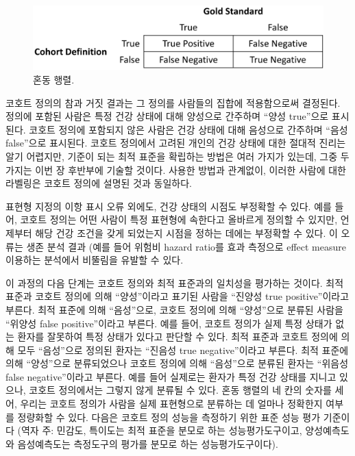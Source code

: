 \documentclass[10.5pt]{book}
\theoremstyle{definition}
\theoremstyle{definition}
\theoremstyle{definition}
\theoremstyle{remark}
\begin{document}
\begin{figure}

{\centering \includegraphics[width=0.75\linewidth]{images/ClinicalValidity/matrix} 

}

\caption{혼동 행렬.}\label{fig:matrix}
\end{figure}

코호트 정의의 참과 거짓 결과는 그 정의를 사람들의 집합에 적용함으로써
결정된다. 정의에 포함된 사람은 특정 건강 상태에 대해 양성으로 간주하며
``양성 true''으로 표시된다. 코호트 정의에 포함되지 않은 사람은 건강
상태에 대해 음성으로 간주하며 ``음성 false''으로 표시된다. 코호트
정의에서 고려된 개인의 건강 상태에 대한 절대적 진리는 알기 어렵지만,
기준이 되는 최적 표준을 확립하는 방법은 여러 가지가 있는데, 그중 두
가지는 이번 장 후반부에 기술할 것이다. 사용한 방법과 관계없이, 이러한
사람에 대한 라벨링은 코호트 정의에 설명된 것과 동일하다.

표현형 지정의 이항 표시 오류 외에도, 건강 상태의 시점도 부정확할 수
있다. 예를 들어, 코호트 정의는 어떤 사람이 특정 표현형에 속한다고
올바르게 정의할 수 있지만, 언제부터 해당 건강 조건을 갖게 되었는지
시점을 정하는 데에는 부정확할 수 있다. 이 오류는 생존 분석 결과 (예를
들어 위험비 hazard ratio를 효과 측정으로 effect measure 이용하는
분석에서 비뚤림을 유발할 수 있다.

이 과정의 다음 단계는 코호트 정의와 최적 표준과의 일치성을 평가하는
것이다. 최적 표준과 코호트 정의에 의해 ``양성''이라고 표기된 사람을
``진양성 true positive''이라고 부른다. 최적 표준에 의해 ``음성''으로,
코호트 정의에 의해 ``양성''으로 분류된 사람을 ``위양성 false
positive''이라고 부른다. 예를 들어, 코호트 정의가 실제 특정 상태가 없는
환자를 잘못하여 특정 상태가 있다고 판단할 수 있다. 최적 표준과 코호트
정의에 의해 모두 ``음성''으로 정의된 환자는 ``진음성 true
negative''이라고 부른다. 최적 표준에 의해 ``양성''으로 분류되었으나
코호트 정의에 의해 ``음성''으로 분류된 환자는 ``위음성 false
negative''이라고 부른다. 예를 들어 실제로는 환자가 특정 건강 상태를
지니고 있으나, 코호트 정의에서는 그렇지 않게 분류될 수 있다. 혼동 행렬의
네 칸의 숫자를 세어, 우리는 코호트 정의가 사람을 실제 표현형으로
분류하는 데 얼마나 정확한지 여부를 정량화할 수 있다. 다음은 코호트 정의
성능을 측정하기 위한 표준 성능 평가 기준이다 (역자 주: 민감도, 특이도는
최적 표준을 분모로 하는 성능평가도구이고, 양성예측도와 음성예측도는
측정도구의 평가를 분모로 하는 성능평가도구이다).
\end{document}
